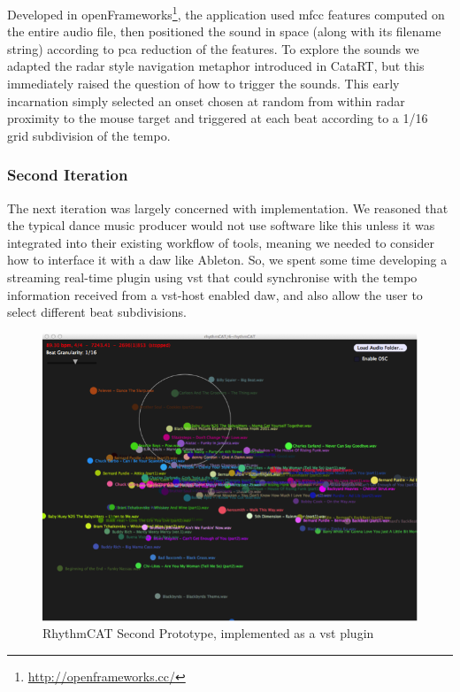 Developed in openFrameworks\footnote{\url{http://openframeworks.cc/}}, the application used \acrshort{mfcc} features computed on the entire audio file, then positioned the sound in space (along with its filename string) according to \acrshort{pca} reduction of the features. To explore the sounds we adapted the radar style navigation metaphor introduced in CataRT, but this immediately raised the question of how to trigger the sounds. This early incarnation simply selected an onset chosen at random from within radar proximity to the mouse target and triggered at each beat according to a 1/16 grid subdivision of the tempo.

\subsubsection{Second Iteration}

The next iteration was largely concerned with implementation. We reasoned that the typical dance music producer would not use software like this unless it was integrated into their existing workflow of tools, meaning we needed to consider how to interface it with a \acrshort{daw} like Ableton. So, we spent some time developing a streaming real-time plugin using \acrfull{vst} that could synchronise with the tempo information received from a \acrshort{vst}-host enabled \acrshort{daw}, and also allow the user to select different beat subdivisions.

\begin{figure}
	\begin{center}
		\includegraphics[width=1.0\textwidth]{ch06_rhythmcat/figures/rhythmcat_proto2.png}
	\end{center}
	\caption[RhythmCAT second prototype]{RhythmCAT Second Prototype, implemented as a \acrshort{vst} plugin}
	\label{fig:rhythmcat_proto2}
\end{figure}

